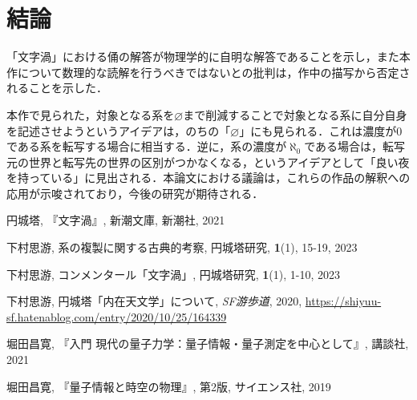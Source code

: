 \documentclass[10pt, a5paper, twoside]{jsarticle}
\theoremstyle{definition}
\begin{document}
	\section{結論}

		「文字渦」における俑の解答が物理学的に自明な解答であることを示し，また本作について数理的な読解を行うべきではないとの批判は，作中の描写から否定されることを示した．

		本作で見られた，対象となる系を$\varnothing$まで削減することで対象となる系に自分自身を記述させようというアイデアは，のちの「$\varnothing$」にも見られる．これは濃度が0である系を転写する場合に相当する．逆に，系の濃度が$\aleph_0$である場合は，転写元の世界と転写先の世界の区別がつかなくなる，というアイデアとして「良い夜を持っている」に見出される．本論文における議論は，これらの作品の解釈への応用が示唆されており，今後の研究が期待される．

	\begin{thebibliography}{99}

		 円城塔, 『文字渦』, 新潮文庫, 新潮社, 2021

		 下村思游, 系の複製に関する古典的考察, 円城塔研究, \textbf{1}(1), 15-19, 2023

		 下村思游, コンメンタール「文字渦」, 円城塔研究, \textbf{1}(1), 1-10, 2023

		 下村思游, 円城塔「内在天文学」について, \textit{SF游歩道}, 2020, \url{https://shiyuu-sf.hatenablog.com/entry/2020/10/25/164339}

		 堀田昌寛, 『入門 現代の量子力学：量子情報・量子測定を中心として』, 講談社, 2021

		 堀田昌寛, 『量子情報と時空の物理』, 第2版, サイエンス社, 2019

	\end{thebibliography}
\end{document}
